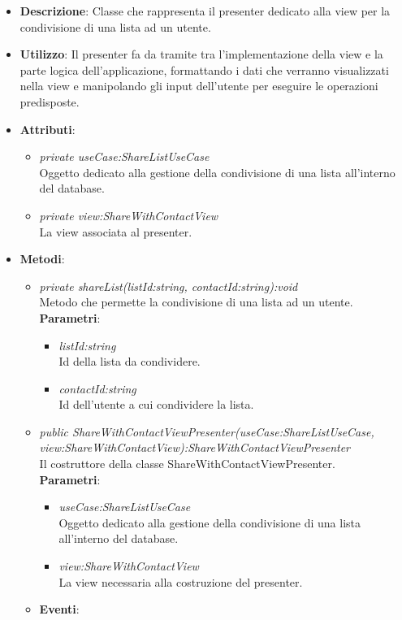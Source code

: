 \begin{itemize}
\item \textbf{Descrizione}: Classe che rappresenta il presenter dedicato alla view per la condivisione di una lista ad un utente.
\item \textbf{Utilizzo}: Il presenter fa da tramite tra l'implementazione della view e la parte logica dell'applicazione, formattando i dati che verranno visualizzati nella view e manipolando gli input dell'utente per eseguire le operazioni predisposte.
\item \textbf{Attributi}: 
\begin{itemize}
\item \textit{private useCase:ShareListUseCase}\\
	Oggetto dedicato alla gestione della condivisione di una lista all'interno del database.
\item \textit{private view:ShareWithContactView}\\
	La view associata al presenter.
\end{itemize}
\item \textbf{Metodi}:
\begin{itemize}
\item \textit{private shareList(listId:string, contactId:string):void}\\
	Metodo che permette la condivisione di una lista ad un utente.
	\\ \textbf{Parametri}: \begin{itemize}
	\item \textit{listId:string}\\
	Id della lista da condividere.
	\item \textit{contactId:string}\\
	Id dell'utente a cui condividere la lista.
	\end{itemize} 
\item \textit{public ShareWithContactViewPresenter(useCase:ShareListUseCase, \\ view:ShareWithContactView):ShareWithContactViewPresenter}\\
	Il costruttore della classe ShareWithContactViewPresenter.
		\\ \textbf{Parametri}: \begin{itemize}
			\item \textit{useCase:ShareListUseCase}\\
			Oggetto dedicato alla gestione della condivisione di una lista all'interno del database.
			\item \textit{view:ShareWithContactView}\\
			La view necessaria alla costruzione del presenter.
\end{itemize} 
\item \textbf{Eventi}:
\end{itemize}
\end{itemize}

